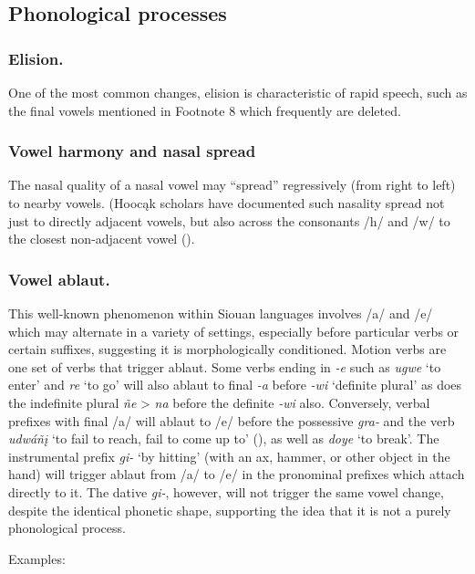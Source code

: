 \documentclass[output=paper]{LSP/langsci}
\begin{document}
\subsection{Phonological processes} 
\subsubsection{Elision.}  One of the most common changes, elision is characteristic of rapid speech, such as the final vowels mentioned in Footnote 8 which frequently are deleted.  			

\subsubsection{Vowel harmony and nasal spread}  The nasal quality of a nasal vowel may ``spread'' regressively (from right to left) to nearby vowels.  (Hooc\k{a}k scholars have documented such nasality spread not just to directly adjacent vowels, but also across the consonants /h/ and /w/ to the closest non-adjacent vowel  (\citealt[7--8]{Helmbrecht2010}).  

\subsubsection{Vowel ablaut.}  This well-known phenomenon within Siouan languages involves /a/ and /e/ which may alternate in a variety of settings, especially before particular verbs or certain suffixes, suggesting it is morphologically conditioned.  Motion verbs are one set of verbs that trigger ablaut.  Some verbs ending in \textit{-e} such as \textit{ugwe} `to enter' and \textit{re} `to go' will also ablaut to final \textit{-a}  before \textit{-wi} `definite plural' as does the indefinite plural \textit{\~ne} > \textit{na} before the definite \textit{-wi} also.  Conversely, verbal prefixes with final /a/ will ablaut to /e/ before the possessive \textit{gra-} and the verb \textit{udwá\~n\k{i}} `to fail to reach, fail to come up to' (\citealt[239-40]{Whitman1947}), as well as \textit{doye} `to break'.  The instrumental prefix \textit{gi-} `by hitting' (with an ax, hammer, or other object in the hand) will trigger ablaut from /a/ to /e/ in the pronominal prefixes which attach directly to it.  The dative \textit{gi-}, however, will not trigger the same vowel change, despite the identical phonetic shape, supporting the idea that it is not a purely phonological process.  

Examples:
\end{document}
